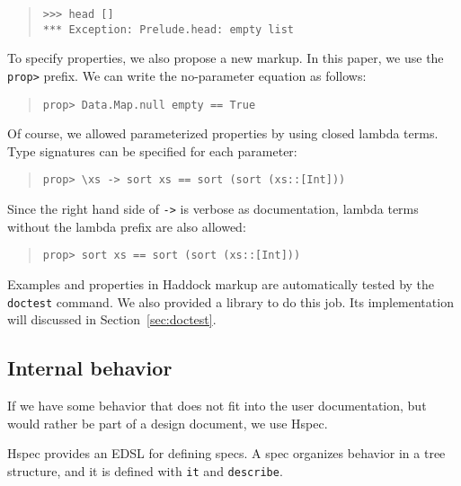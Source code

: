 \documentclass[preprint]{sigplanconf}
\newcommand{\hspec}{Hspec}
\begin{document}
\begin{quote}
\small
\begin{verbatim}
>>> head []
*** Exception: Prelude.head: empty list
\end{verbatim}
\end{quote}

To specify properties, we also propose a new markup. In this paper, we use the {\tt prop>} prefix. We can write the no-parameter equation as follows:

\begin{quote}
\small
\begin{verbatim}
prop> Data.Map.null empty == True
\end{verbatim}
\end{quote}

\noindent Of course, we allowed parameterized properties by
using closed lambda terms.
Type signatures can be specified for each parameter:

\begin{quote}
\small
\begin{verbatim}
prop> \xs -> sort xs == sort (sort (xs::[Int]))
\end{verbatim}
\end{quote}

\noindent Since the right hand side of {\tt ->} is verbose as documentation,
lambda terms without the lambda prefix are also allowed:

\begin{quote}
\small
\begin{verbatim}
prop> sort xs == sort (sort (xs::[Int]))
\end{verbatim}
\end{quote}

Examples and properties in Haddock markup are automatically
tested by the {\tt doctest} command. We also provided a library
to do this job. Its implementation will discussed in Section~\ref{sec:doctest}.

\subsection{Internal behavior}
\label{sec:Internal-behavior}

If we have some behavior that does not fit into the user documentation, but
would rather be part of a design document, we use \hspec{}.

\hspec{} provides an EDSL for defining specs.  A spec organizes behavior in a
tree structure, and it is defined with \texttt{it} and \texttt{describe}.
\end{document}
